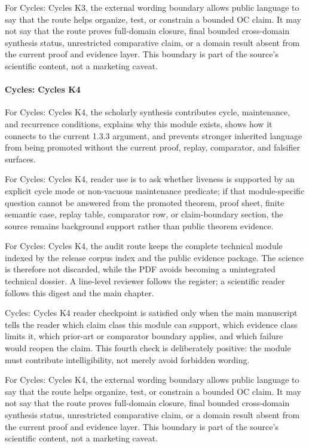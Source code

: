 For Cycles: Cycles K3, the external wording boundary allows public language to say that the route helps organize, test, or constrain a bounded OC claim. It may not say that the route proves full-domain closure, final bounded cross-domain synthesis status, unrestricted comparative claim, or a domain result absent from the current proof and evidence layer. This boundary is part of the source's scientific content, not a marketing caveat.


\paragraph{Cycles: Cycles K4}

For Cycles: Cycles K4, the scholarly synthesis contributes cycle, maintenance, and recurrence conditions, explains why this module exists, shows how it connects to the current 1.3.3 argument, and prevents stronger inherited language from being promoted without the current proof, replay, comparator, and falsifier surfaces.


For Cycles: Cycles K4, reader use is to ask whether liveness is supported by an explicit cycle mode or non-vacuous maintenance predicate; if that module-specific question cannot be answered from the promoted theorem, proof sheet, finite semantic case, replay table, comparator row, or claim-boundary section, the source remains background support rather than public theorem evidence.


For Cycles: Cycles K4, the audit route keeps the complete technical module indexed by the release corpus index and the public evidence package. The science is therefore not discarded, while the PDF avoids becoming a unintegrated technical dossier. A line-level reviewer follows the register; a scientific reader follows this digest and the main chapter.


Cycles: Cycles K4 reader checkpoint is satisfied only when the main manuscript tells the reader which claim class this module can support, which evidence class limits it, which prior-art or comparator boundary applies, and which failure would reopen the claim. This fourth check is deliberately positive: the module must contribute intelligibility, not merely avoid forbidden wording.


For Cycles: Cycles K4, the external wording boundary allows public language to say that the route helps organize, test, or constrain a bounded OC claim. It may not say that the route proves full-domain closure, final bounded cross-domain synthesis status, unrestricted comparative claim, or a domain result absent from the current proof and evidence layer. This boundary is part of the source's scientific content, not a marketing caveat.


